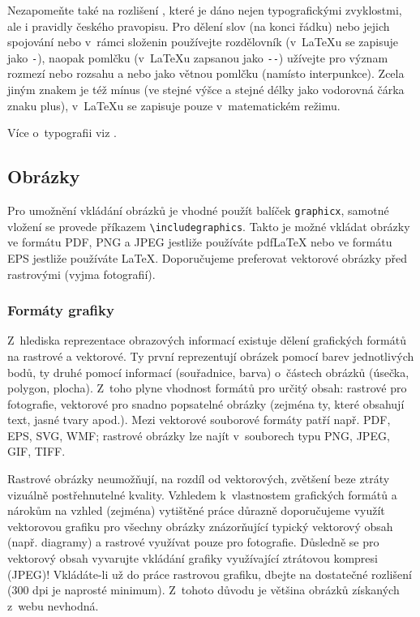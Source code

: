 \documentclass[thesis=M,czech]{FITthesis}[2012/10/20]
\begin{document}
Nezapomeňte také na rozlišení , které je dáno nejen typografickými zvyklostmi, ale i pravidly českého pravopisu. Pro dělení slov (na konci řádku) nebo jejich spojování nebo v~rámci složenin používejte rozdělovník (v~\LaTeX{}u se zapisuje jako \verb|-|), naopak pomlčku (v~\LaTeX{}u zapsanou jako \verb|--|) užívejte pro význam rozmezí nebo rozsahu a nebo jako větnou pomlčku (namísto interpunkce). Zcela jiným znakem je též mínus (ve stejné výšce a stejné délky jako vodorovná čárka znaku plus), v~\LaTeX{}u se zapisuje pouze v~matematickém režimu.

Více o~typografii viz \cite{kobltypo}.

\subsection{Obrázky}

Pro umožnění vkládání obrázků je vhodné použít balíček \verb|graphicx|, samotné vložení se provede příkazem \verb|\includegraphics|. Takto je možné vkládat obrázky ve formátu PDF, PNG a JPEG jestliže používáte pdf\LaTeX{} nebo ve formátu EPS jestliže používáte \LaTeX{}. Doporučujeme preferovat vektorové obrázky před rastrovými (vyjma fotografií).

\subsubsection{Formáty grafiky}

Z~hlediska reprezentace obrazových informací existuje dělení grafických formátů na rastrové a vektorové. Ty první reprezentují obrázek pomocí barev jednotlivých bodů, ty druhé pomocí informací (souřadnice, barva) o~částech obrázků (úsečka, polygon, plocha). Z~toho plyne vhodnost formátů pro určitý obsah: rastrové pro fotografie, vektorové pro snadno popsatelné obrázky (zejména ty, které obsahují text, jasné tvary apod.). Mezi vektorové souborové formáty patří např. PDF, EPS, SVG, WMF; rastrové obrázky lze najít v~souborech typu PNG, JPEG, GIF, TIFF.

Rastrové obrázky neumožňují, na rozdíl od vektorových, zvětšení beze ztráty vizuálně postřehnutelné kvality. Vzhledem k~vlastnostem grafických formátů a nárokům na vzhled (zejména) vytištěné práce důrazně doporučujeme využít vektorovou grafiku pro všechny obrázky znázorňující typický vektorový obsah (např. diagramy) a rastrové využívat pouze pro fotografie. Důsledně se pro vektorový obsah vyvarujte vkládání grafiky využívající ztrátovou kompresi (JPEG)! Vkládáte-li už do práce rastrovou grafiku, dbejte na dostatečné rozlišení (300 dpi je naprosté minimum). Z~tohoto důvodu je většina obrázků získaných z~webu nevhodná.
\end{document}
